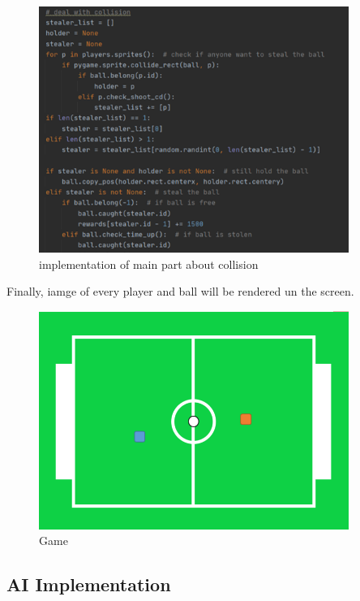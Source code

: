 \documentclass[14pt]{extarticle}
\begin{document}
	\begin{figure}[H]
	\begin{center}
		\includegraphics[width=0.9\textwidth]{collision}
		\caption{implementation of main part about collision}
	\end{center}
	\end{figure}
	Finally, iamge of every player and ball will be rendered un the screen.
	\begin{figure}[H]
		\begin{center}
			\includegraphics[width=0.9\textwidth]{game}
			\caption{Game}
		\end{center}
	\end{figure}

\subsection{AI Implementation}
	
\end{document}
